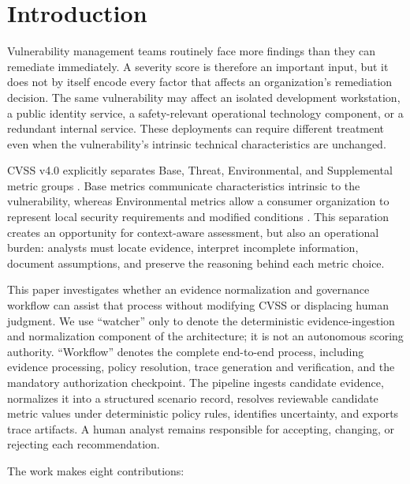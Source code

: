\documentclass[conference]{IEEEtran}
\begin{document}
\section{Introduction}

Vulnerability management teams routinely face more findings than they can
remediate immediately. A severity score is therefore an important input, but it
does not by itself encode every factor that affects an organization's
remediation decision. The same vulnerability may affect an isolated
development workstation, a public identity service, a safety-relevant
operational technology component, or a redundant internal service. These
deployments can require different treatment even when the vulnerability's
intrinsic technical characteristics are unchanged.

CVSS v4.0 explicitly separates Base, Threat, Environmental, and Supplemental
metric groups \cite{first_cvss40,first_spec}. Base metrics communicate
characteristics intrinsic to the vulnerability, whereas Environmental metrics
allow a consumer organization to represent local security requirements and
modified conditions \cite{first_user_guide,first_implementation}. This
separation creates an opportunity for context-aware assessment, but also an
operational burden: analysts must locate evidence, interpret incomplete
information, document assumptions, and preserve the reasoning behind each
metric choice.

This paper investigates whether an evidence normalization and governance workflow can assist that process
without modifying CVSS or displacing human judgment. We use ``watcher'' only to denote the deterministic evidence-ingestion and normalization component of the architecture; it is not an autonomous scoring authority. ``Workflow'' denotes the complete end-to-end process, including evidence processing, policy resolution, trace generation and verification, and the mandatory authorization checkpoint.
The pipeline ingests candidate evidence, normalizes it into a structured scenario record, resolves
reviewable candidate metric values under deterministic policy rules, identifies uncertainty, and exports trace artifacts.
A human analyst remains responsible for accepting, changing, or rejecting each
recommendation.

The work makes eight contributions:
\end{document}
